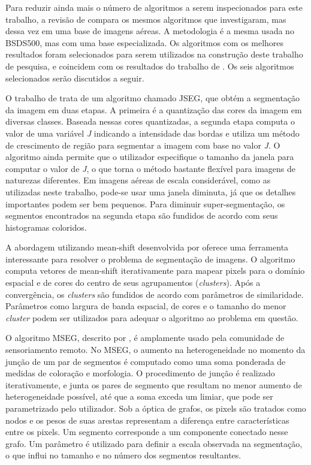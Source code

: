 Para reduzir ainda mais o número de algoritmos a serem inspecionados para este trabalho, a revisão de  compara os mesmos algoritmos que  investigaram, mas dessa vez em uma base de imagens aéreas. A metodologia é a mesma usada no BSDS500, mas com uma base especializada. Os algoritmos com os melhores resultados foram selecionados para serem utilizados na construção deste trabalho de pesquisa, e coincidem com os resultados do trabalho de . Os seis algoritmos selecionados serão discutidos a seguir.

O trabalho de  trata de um algoritmo chamado JSEG, que obtém a segmentação da imagem em duas etapas. A primeira é a  quantização das cores da imagem em diversas classes. Baseada nessas cores quantizadas, a segunda etapa computa o valor de uma variável \textit{J} indicando a intensidade das bordas e utiliza um método de crescimento de região para segmentar a imagem com base no valor \textit{J}. O algoritmo ainda permite que o utilizador especifique o tamanho da janela para computar o valor de \textit{J}, o que torna o método bastante flexível para imagens de naturezas diferentes. Em imagens aéreas de escala considerável, como as utilizadas neste trabalho, pode-se usar uma janela diminuta, já que os detalhes importantes podem ser bem pequenos. Para diminuir super-segmentação, os segmentos encontrados na segunda etapa são fundidos de acordo com seus histogramas coloridos.

A abordagem utilizando mean-shift desenvolvida por  oferece uma ferramenta interessante para resolver o problema de segmentação de imagens. O algoritmo computa vetores de mean-shift iterativamente para mapear pixels para o domínio espacial e de cores do centro de seus agrupamentos (\textit{clusters}). Após a convergência, os \textit{clusters} são fundidos de acordo com parâmetros de similaridade. Parâmetros como largura de banda espacial, de cores e o tamanho do menor \textit{cluster} podem ser utilizados para adequar o algoritmo ao problema em questão.

O algoritmo MSEG, descrito por , é amplamente usado pela comunidade de sensoriamento remoto. No MSEG, o aumento na heterogeneidade no momento da junção de um par de segmentos é computado como uma soma ponderada de medidas de coloração e morfologia. O procedimento de junção é realizado iterativamente, e  junta os pares de segmento que resultam no menor aumento de heterogeneidade possível, até que a soma exceda um limiar, que pode ser parametrizado pelo utilizador. Sob a óptica de grafos, os pixels são tratados como nodos e os pesos de suas arestas representam a diferença entre características entre os pixels. Um segmento corresponde a um componente conectado nesse grafo. Um parâmetro é utilizado para definir a escala observada na segmentação, o que influi no tamanho e no número dos segmentos resultantes.

